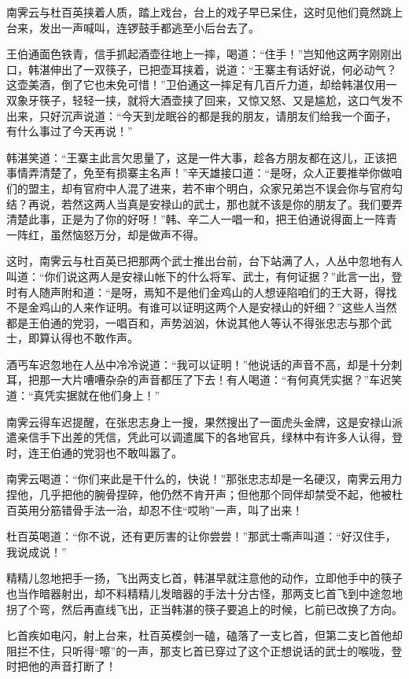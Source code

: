 \documentclass[12pt,oneside]{book}
\begin{document}
南霁云与杜百英挟着人质，踏上戏台，台上的戏子早已呆住，这时见他们竟然跳上台来，发出一声喊叫，连锣鼓手都逃至小后台去了。

王伯通面色铁青，信手抓起酒壶往地上一摔，喝道：``住手！''岂知他这两字刚刚出口，韩湛伸出了一双筷子，已把壶耳挟着，说道：``王寨主有话好说，何必动气？这壶美酒，倒了它也未免可惜！''卫伯通这一摔足有几百斤力道，却给韩湛仅用一双象牙筷子，轻轻一挟，就将大酒壶挟了回来，又惊又怒、又是尴尬，这口气发不出来，只好沉声说道：``今天到龙眠谷的都是我的朋友，请朋友们给我一个面子，有什么事过了今天再说！''

韩湛笑道：``王寨主此言欠思量了，这是一件大事，趁各方朋友都在这儿，正该把事情弄清楚了，免至有损寨主名声！''辛天雄接口道：``是呀，众人正要推举你做咱们的盟主，却有官府中人混了进来，若不审个明白，众家兄弟岂不误会你与官府勾结？再说，若然这两人当真是安禄山的武士，那也就不该是你的朋友了。我们要弄清楚此事，正是为了你的好呀！''韩、辛二人一唱一和，把王伯通说得面上一阵青一阵红，虽然恼怒万分，却是做声不得。

这时，南霁云与杜百英已把那两个武士推出台前，台下站满了人，人丛中忽地有人叫道：``你们说这两人是安禄山帐下的什么将军、武士，有何证据？''此言一出，登时有人随声附和道：``是呀，焉知不是他们金鸡山的人想诬陷咱们的王大哥，得找不是金鸡山的人来作证明。有谁可以证明这两个人是安禄山的奸细？''这些人当然都是王伯通的党羽，一唱百和，声势汹汹，休说其他人等认不得张忠志与那个武士，即算认得也不敢作声。

酒丐车迟忽地在人丛中冷冷说道：``我可以证明！''他说话的声音不高，却是十分刺耳，把那一大片嘈嘈杂杂的声音都压了下去！有人喝道：``有何真凭实据？''车迟笑道：``真凭实据就在他们身上！''

南霁云得车迟提醒，在张忠志身上一搜，果然搜出了一面虎头金牌，这是安禄山派遣亲信手下出差的凭信，凭此可以调遣属下的各地官兵，绿林中有许多人认得，登时，连王伯通的党羽也不敢叫嚣了。

南霁云喝道：``你们来此是干什么的，快说！''那张忠志却是一名硬汉，南霁云用力捏他，几乎把他的腕骨捏碎，他仍然不肯开声；但他那个同伴却禁受不起，他被杜百英用分筋错骨手法一治，却忍不住``哎哟''一声，叫了出来！

杜百英喝道：``你不说，还有更厉害的让你尝尝！''那武士嘶声叫道：``好汉住手，我说成说！''

精精儿忽地把手一扬，飞出两支匕首，韩湛早就注意他的动作，立即他手中的筷子也当作暗器射出，却不料精精儿发暗器的手法十分古怪，那两支匕首飞到中途忽地拐了个弯，然后再直线飞出，正当韩湛的筷子要追上的时候，匕前已改换了方向。

匕首疾如电闪，射上台来，杜百英模剑一磕，磕落了一支匕首，但第二支匕首他却阻拦不住，只听得``嚓''的一声，那支匕首已穿过了这个正想说话的武士的喉咙，登时把他的声音打断了！
\end{document}
